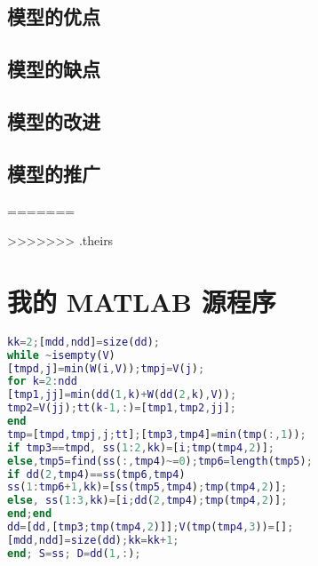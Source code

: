 \documentclass[bwprint]{gmcmthesis}
\begin{document}
\subsection{模型的优点}

\subsection{模型的缺点}
\subsection{模型的改进}
\subsection{模型的推广}

=======







































>>>>>>> .theirs










\newpage
\appendix
\section{我的 MATLAB 源程序}
\begin{lstlisting}[language=Matlab]%设置不同语言即可。
kk=2;[mdd,ndd]=size(dd);
while ~isempty(V)
[tmpd,j]=min(W(i,V));tmpj=V(j);
for k=2:ndd
[tmp1,jj]=min(dd(1,k)+W(dd(2,k),V));
tmp2=V(jj);tt(k-1,:)=[tmp1,tmp2,jj];
end
tmp=[tmpd,tmpj,j;tt];[tmp3,tmp4]=min(tmp(:,1));
if tmp3==tmpd, ss(1:2,kk)=[i;tmp(tmp4,2)];
else,tmp5=find(ss(:,tmp4)~=0);tmp6=length(tmp5);
if dd(2,tmp4)==ss(tmp6,tmp4)
ss(1:tmp6+1,kk)=[ss(tmp5,tmp4);tmp(tmp4,2)];
else, ss(1:3,kk)=[i;dd(2,tmp4);tmp(tmp4,2)];
end;end
dd=[dd,[tmp3;tmp(tmp4,2)]];V(tmp(tmp4,3))=[];
[mdd,ndd]=size(dd);kk=kk+1;
end; S=ss; D=dd(1,:);


 \end{lstlisting}
\end{document}
